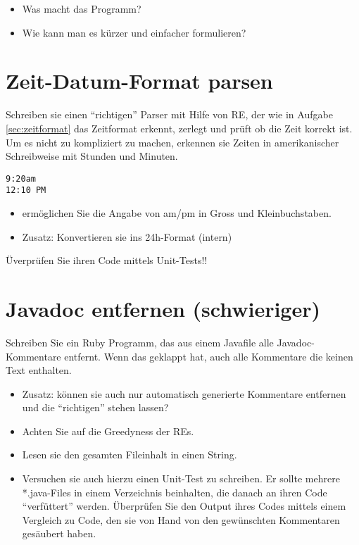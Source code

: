 \documentclass[a4paper,11pt,oneside]{scrbook}
\begin{document}
\begin{itemize}
	\item Was macht das Programm?
	\item Wie kann man es kürzer und einfacher formulieren?
\end{itemize}



\section{Zeit-Datum-Format parsen} %
\label{sec:zeit_datum_format_parsen}
Schreiben sie einen “richtigen” Parser mit Hilfe von RE, der wie in Aufgabe \ref{sec:zeitformat} das Zeitformat erkennt, zerlegt und prüft ob die Zeit korrekt ist. Um es nicht zu kompliziert zu machen, erkennen sie Zeiten in amerikanischer Schreibweise mit Stunden und Minuten.

\begin{lstlisting}
9:20am
12:10 PM
\end{lstlisting}

\begin{itemize}
	\item ermöglichen Sie die Angabe von am/pm in Gross und Kleinbuchstaben.
	\item Zusatz: Konvertieren sie ins 24h-Format (intern)
\end{itemize}

Üverprüfen Sie ihren Code mittels Unit-Tests!!

\section{Javadoc entfernen (schwieriger)} %
\label{sec:javadoc_entfernen}
Schreiben Sie ein Ruby Programm, das aus einem Javafile alle Javadoc-Kommentare entfernt. Wenn das geklappt hat, auch alle Kommentare die keinen Text enthalten.
\begin{itemize}
	\item Zusatz: können sie auch nur automatisch generierte Kommentare entfernen und die “richtigen” stehen lassen?
	\item Achten Sie auf die Greedyness der REs.
	\item Lesen sie den gesamten Fileinhalt in einen String.
	\item Versuchen sie auch hierzu einen Unit-Test zu schreiben. Er sollte mehrere *.java-Files in einem Verzeichnis beinhalten, die danach an ihren Code “verfüttert” werden. Überprüfen Sie den Output ihres Codes mittels einem Vergleich zu Code, den sie von Hand von den gewünschten Kommentaren gesäubert haben.
\end{itemize}
\end{document}
